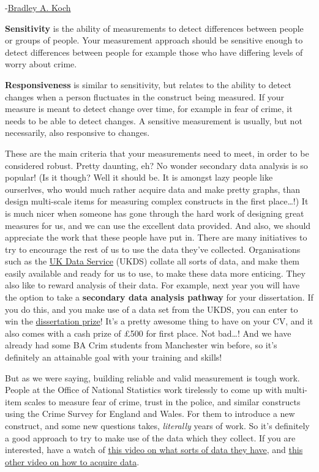 \documentclass[
]{book}
\begin{document}
-\href{http://www.socingoutloud.com/2012/10/teaching-validity-and-reliability-in.html}{Bradley A. Koch}

\textbf{Sensitivity} is the ability of measurements to detect differences between people or groups of people. Your measurement approach should be sensitive enough to detect differences between people for example those who have differing levels of worry about crime.

\textbf{Responsiveness} is similar to sensitivity, but relates to the ability to detect changes when a person fluctuates in the construct being measured. If your measure is meant to detect change over time, for example in fear of crime, it needs to be able to detect changes. A sensitive measurement is usually, but not necessarily, also responsive to changes.

These are the main criteria that your measurements need to meet, in order to be considered robust. Pretty daunting, eh? No wonder secondary data analysis is so popular! (Is it though? Well it should be. It is amongst lazy people like ourserlves, who would much rather acquire data and make pretty graphs, than design multi-scale items for measuring complex constructs in the first place\ldots!) It is much nicer when someone has gone through the hard work of designing great measures for us, and we can use the excellent data provided. And also, we should appreciate the work that these people have put in. There are many initiatives to try to encourage the rest of us to use the data they've collected. Organisations such as the \href{https://www.ukdataservice.ac.uk/}{UK Data Service} (UKDS) collate all sorts of data, and make them easily available and ready for us to use, to make these data more enticing. They also like to reward analysis of their data. For example, next year you will have the option to take a \textbf{secondary data analysis pathway} for your dissertation. If you do this, and you make use of a data set from the UKDS, you can enter to win the \href{https://ukdataservice.ac.uk/learning-hub/new-to-using-data/students/dissertation-award/}{dissertation prize}! It's a pretty awesome thing to have on your CV, and it also comes with a cash prize of £500 for first place. Not bad\ldots! And we have already had some BA Crim students from Manchester win before, so it's definitely an attainable goal with your training and skills!

But as we were saying, building reliable and valid measurement is tough work. People at the Office of National Statistics work tirelessly to come up with multi-item scales to measure fear of crime, trust in the police, and similar constructs using the Crime Survey for England and Wales. For them to introduce a new construct, and some new questions takes, \emph{literally} years of work. So it's definitely a good approach to try to make use of the data which they collect. If you are interested, have a watch of \href{https://www.youtube.com/watch?v=cCpHnqn0Q2c\&list=PLG87Imnep1SljSqc0yLIHYBP1w0saMJn-\&index=2}{this video on what sorts of data they have}, and \href{https://www.youtube.com/watch?v=M-tN2FP0_0k}{this other video on how to acquire data}.
\end{document}
